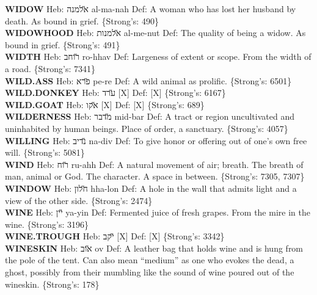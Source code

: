 {\textbf{WIDOW} Heb: {\large\H אלמנה} al-ma-nah Def: A woman who has lost her husband by death. As bound in grief. \{Strong's: 490\}\hfill{}\\

\textbf{WIDOWHOOD} Heb: {\large\H אלמנות} al-me-nut Def: The quality of being a widow. As bound in grief. \{Strong's: 491\}\hfill{}\\

\textbf{WIDTH} Heb: {\large\H רוחב} ro-hhav Def: Largeness of extent or scope. From the width of a road. \{Strong's: 7341\}\hfill{}\\

\textbf{WILD.ASS} Heb: {\large\H פרא} pe-re Def: A wild animal as prolific. \{Strong's: 6501\}\hfill{}\\

\textbf{WILD.DONKEY} Heb: {\large\H ערד} {[}X{]} Def: {[}X{]} \{Strong's: 6167\}\hfill{}\\

\textbf{WILD.GOAT} Heb: {\large\H אקו} {[}X{]} Def: {[}X{]} \{Strong's: 689\}\hfill{}\\

\textbf{WILDERNESS} Heb: {\large\H מדבר} mid-bar Def: A tract or region uncultivated and uninhabited by human beings. Place of order, a sanctuary. \{Strong's: 4057\}\hfill{}\\

\textbf{WILLING} Heb: {\large\H נדיב} na-div Def: To give honor or offering out of one's own free will. \{Strong's: 5081\}\hfill{}\\

\textbf{WIND} Heb: {\large\H רוח} ru-ahh Def: A natural movement of air; breath. The breath of man, animal or God. The character. A space in between. \{Strong's: 7305, 7307\}\hfill{}\\

\textbf{WINDOW} Heb: {\large\H חלון} hha-lon Def: A hole in the wall that admits light and a view of the other side. \{Strong's: 2474\}\hfill{}\\

\textbf{WINE} Heb: {\large\H יין} ya-yin Def: Fermented juice of fresh grapes. From the mire in the wine. \{Strong's: 3196\}\hfill{}\\

\textbf{WINE.TROUGH} Heb: {\large\H יקב} {[}X{]} Def: {[}X{]} \{Strong's: 3342\}\hfill{}\\

\textbf{WINESKIN} Heb: {\large\H אוב} ov Def: A leather bag that holds wine and is hung from the pole of the tent. Can also mean ``medium'' as one who evokes the dead, a ghost, possibly from their mumbling like the sound of wine poured out of the wineskin. \{Strong's: 178\}\hfill{}\\

}
